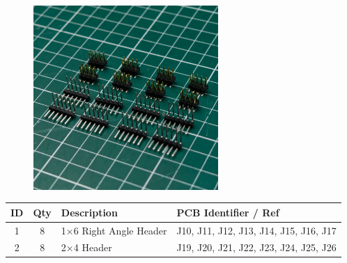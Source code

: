 \documentclass[12pt, a4paper]{article}
\newcommand{\drawrect}[2]{
    \draw[black, line width=2pt, rounded corners=3] (#1) rectangle (#2);
    \draw[white, line width=1pt, rounded corners=3] (#1) rectangle (#2);
}
\newcommand{\drawtext}[2]{
    \node[white] at (#1) {\contourlength{.075em}\contour{black}{#2}};
}
\begin{document}
\begin{figure}[H]
    \centering
    \hspace{2mm}
    \includegraphics[width=7cm]{images/headers_side.jpg}
\end{figure}

\begin{center}
    \small
    \setlength\extrarowheight{4pt}
    \begin{tabularx}{\textwidth}{|c|c|X|l|}
        \hline \rowcolor{lightgray} ID & Qty & Description & PCB Identifier / Ref\\
        \hline 1 & 8 & 1×6 Right Angle Header & J10, J11, J12, J13, J14, J15, J16, J17\\
        \hline 2 & 8 & 2×4 Header & J19, J20, J21, J22, J23, J24, J25, J26\\
        \hline
    \end{tabularx}
\end{center}
\end{document}

